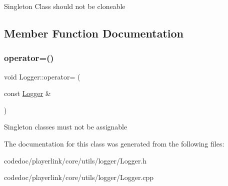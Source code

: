 Singleton Class should not be cloneable 

\subsection{Member Function Documentation}
\mbox{\label{classLogger_af7266f0b4cc9b6c05a20fb76b96c4ada}} 
\subsubsection{\texorpdfstring{operator=()}{operator=()}}
{\footnotesize\ttfamily void Logger\+::operator= (\begin{DoxyParamCaption}\item[{const \hyperlink{classLogger}{Logger} \&}]{ }\end{DoxyParamCaption})\hspace{0.3cm}{\ttfamily [delete]}}

Singleton classes must not be assignable 

The documentation for this class was generated from the following files\+:\begin{DoxyCompactItemize}
\item 
codedoc/playerlink/core/utils/logger/Logger.\+h\item 
codedoc/playerlink/core/utils/logger/Logger.\+cpp\end{DoxyCompactItemize}
